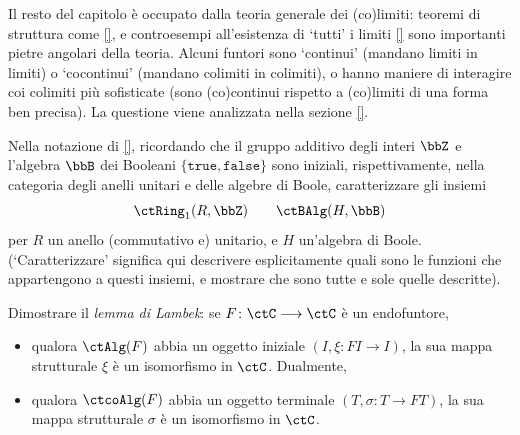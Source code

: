 Il resto del capitolo è occupato dalla teoria generale dei (co)limiti: teoremi di struttura come \ref{}, e controesempi all'esistenza di `tutti' i limiti \ref{} sono importanti pietre angolari della teoria. Alcuni funtori sono `continui' (mandano limiti in limiti) o `cocontinui' (mandano colimiti in colimiti), o hanno maniere di interagire coi colimiti più sofisticate (sono (co)continui rispetto a (co)limiti di una forma ben precisa). La questione viene analizzata nella sezione \ref{}.
\begin{esercizi}
 \item \label{ex_21_1} Nella notazione di \ref{}, ricordando che il gruppo additivo degli interi \(\bbZ\) e l'algebra \(\bbB\) dei Booleani \(\{\texttt{true},\texttt{false}\}\) sono iniziali, rispettivamente, nella categoria degli anelli unitari e delle algebre di Boole, caratterizzare gli insiemi
 \[\Hom{\ctRing_1}(R,\bbZ) \qquad \Hom{\ctBAlg}(H,\bbB)\]
 per \(R\) un anello (commutativo e) unitario, e \(H\) un'algebra di Boole. (`Caratterizzare' significa qui descrivere esplicitamente quali sono le funzioni che appartengono a questi insiemi, e mostrare che sono tutte e sole quelle descritte).
 \item \label{ex_21_2} Dimostrare il \emph{lemma di Lambek}: se \(F \colon \ctC \fun\ctC\) è un endofuntore,
 \begin{itemize}
  \item qualora \(\ctAlg(F)\) abbia un oggetto iniziale \((I,\xi \colon FI \to I)\), la sua mappa strutturale \(\xi\) è un isomorfismo in \(\ctC\). Dualmente,
  \item qualora \(\ctcoAlg(F)\) abbia un oggetto terminale \((T,\sigma \colon T \to FT)\), la sua mappa strutturale \(\sigma\) è un isomorfismo in \(\ctC\).
 \end{itemize}
 \item \label{ex_21_3}
 \item \label{ex_21_4}
 \item \label{ex_21_5}
\end{esercizi}
